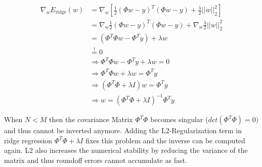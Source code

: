 %
\newpage
{}
%
\begin{align*}
\nabla_w E_\text{ridge}(w) &= \nabla_w \left[\frac{1}{2} (\Phi w - y)^T (\Phi w - y) + \frac{\lambda}{2} ||w||^2_2 \right] \\
&= \nabla_w \frac{1}{2} (\Phi w - y)^T (\Phi w - y) + \nabla_w \frac{\lambda}{2} ||w||^2_2 \\
&= (\Phi^T \Phi w - \Phi^T y) + \lambda w \\
&\overset{!}{=} 0 \\
&\Rightarrow \Phi^T\Phi w - \Phi^T y + \lambda w = 0 \\
&\Rightarrow \Phi^T\Phi w  + \lambda w = \Phi^T y \\
&\Rightarrow (\Phi^T \Phi + \lambda I) w = \Phi^T y \\
&\Rightarrow w = (\Phi^T \Phi + \lambda I)^{-1} \Phi^T y
\end{align*}
\begin{flushleft}
  When $N < M$ then the covariance Matrix $\Phi^T \Phi$ becomes singular ($det(\Phi^T\Phi) = 0)$ and thus cannot be inverted anymore. Adding the L2-Regularization term in ridge regression $\Phi^T \Phi + \lambda I$ fixes this problem and the inverse can be computed again. L2 also increases the numerical stability by reducing the variance of the matrix and thus roundoff errors cannot accumulate as fast.
\end{flushleft}
%
%
%
%
%
%
%
%
%

%



